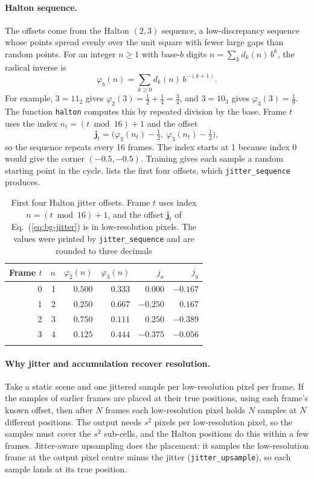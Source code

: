 \paragraph{Halton sequence.} The offsets come from the Halton $(2,3)$ sequence, a low-discrepancy sequence whose points spread evenly over the unit square with fewer large gaps than random points.\cite{halton1960efficiency} For an integer $n\ge1$ with base-$b$ digits $n=\sum_k d_k(n)\,b^k$, the radical inverse is
\begin{equation}
\varphi_b(n)=\sum_{k\ge0}d_k(n)\,b^{-(k+1)}.\label{eq:bg-halton}
\end{equation}
For example, $3=11_2$ gives $\varphi_2(3)=\tfrac12+\tfrac14=\tfrac34$, and $3=10_3$ gives $\varphi_3(3)=\tfrac19$. The function \texttt{halton} computes this by repeated division by the base. Frame $t$ uses the index $n_t=(t\bmod16)+1$ and the offset
\begin{equation}
\mathbf j_t=\big(\varphi_2(n_t)-\tfrac12,\ \varphi_3(n_t)-\tfrac12\big),\label{eq:bg-jitter}
\end{equation}
so the sequence repeats every 16 frames. The index starts at 1 because index 0 would give the corner $(-0.5,-0.5)$. Training gives each sample a random starting point in the cycle.  lists the first four offsets, which \texttt{jitter\_sequence} produces.

\begin{table}[!htbp]
\caption{First four Halton jitter offsets. Frame $t$ uses index $n=(t\bmod16)+1$, and the offset $\mathbf j_t$ of Eq.~(\ref{eq:bg-jitter}) is in low-resolution pixels. The values were printed by \texttt{jitter\_sequence} and are rounded to three decimals}\label{tab:bg-halton}
\begin{tabular*}{\columnwidth}{@{\extracolsep\fill}rrrrrr}
\toprule
Frame $t$ & $n$ & $\varphi_2(n)$ & $\varphi_3(n)$ & $j_x$ & $j_y$ \\
\midrule
0 & 1 & $0.500$ & $0.333$ & $0.000$ & $-0.167$ \\
1 & 2 & $0.250$ & $0.667$ & $-0.250$ & $0.167$ \\
2 & 3 & $0.750$ & $0.111$ & $0.250$ & $-0.389$ \\
3 & 4 & $0.125$ & $0.444$ & $-0.375$ & $-0.056$ \\
\botrule
\end{tabular*}
\end{table}

\paragraph{Why jitter and accumulation recover resolution.} Take a static scene and one jittered sample per low-resolution pixel per frame. If the samples of earlier frames are placed at their true positions, using each frame's known offset, then after $N$ frames each low-resolution pixel holds $N$ samples at $N$ different positions. The output needs $s^2$ pixels per low-resolution pixel, so the samples must cover the $s^2$ sub-cells, and the Halton positions do this within a few frames. Jitter-aware upsampling does the placement: it samples the low-resolution frame at the output pixel centre minus the jitter (\texttt{jitter\_upsample}), so each sample lands at its true position.

